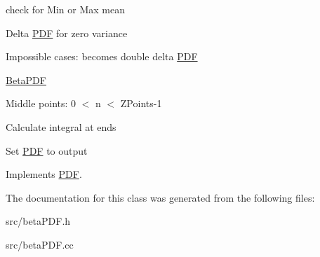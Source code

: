 check for Min or Max mean

Delta \hyperlink{classPDF}{PDF} for zero variance

Impossible cases: becomes double delta \hyperlink{classPDF}{PDF}

\hyperlink{classBetaPDF}{BetaPDF}

Middle points: 0 $<$ n $<$ ZPoints-\/1

Calculate integral at ends

Set \hyperlink{classPDF}{PDF} to output 

Implements \hyperlink{classPDF}{PDF}.

The documentation for this class was generated from the following files:\begin{DoxyCompactItemize}
\item 
src/betaPDF.h\item 
src/betaPDF.cc\end{DoxyCompactItemize}
